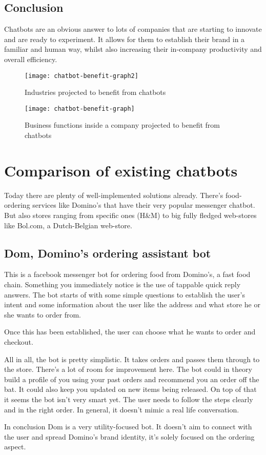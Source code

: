 \subsection{Conclusion}

Chatbots are an obvious answer to lots of companies that are starting to innovate and are ready to experiment. It allows for them to establish their brand in a familiar and human way, whilst also increasing their in-company productivity and overall efficiency.

\begin{figure}[p]
  \centering
  \texttt{[image: chatbot-benefit-graph2]}\label{fig:chatbot-benefit-graph2}
  \caption{Industries projected to benefit from chatbots~\cite{chatbot-industry-benefits}}
\end{figure}

\begin{figure}[p]
  \centering
  \texttt{[image: chatbot-benefit-graph]}\label{fig:chatbot-benefit-graph}
  \caption{Business functions inside a company projected to benefit from chatbots~\cite{chatbot-industry-benefits}}
\end{figure}

\newpage

\section{Comparison of existing chatbots}

Today there are plenty of well-implemented solutions already. There's food-ordering services like Domino's that have their very popular messenger chatbot. But also stores ranging from specific ones (H\&M) to big fully fledged web-stores like Bol.com, a Dutch-Belgian web-store.

\subsection{Dom, Domino's ordering assistant bot}

This is a facebook messenger bot for ordering food from Domino's, a fast food chain. Something you immediately notice is the use of tappable quick reply answers. The bot starts of with some simple questions to establish the user's intent and some information about the user like the address and what store he or she wants to order from.

Once this has been established, the user can choose what he wants to order and checkout.

All in all, the bot is pretty simplistic. It takes orders and passes them through to the store. There's a lot of room for improvement here. The bot could in theory build a profile of you using your past orders and recommend you an order off the bat. It could also keep you updated on new items being released. On top of that it seems the bot isn't very smart yet. The user needs to follow the steps clearly and in the right order. In general, it doesn't mimic a real life conversation.

In conclusion Dom is a very utility-focused bot. It doesn't aim to connect with the user and spread Domino's brand identity, it's solely focused on the ordering aspect.